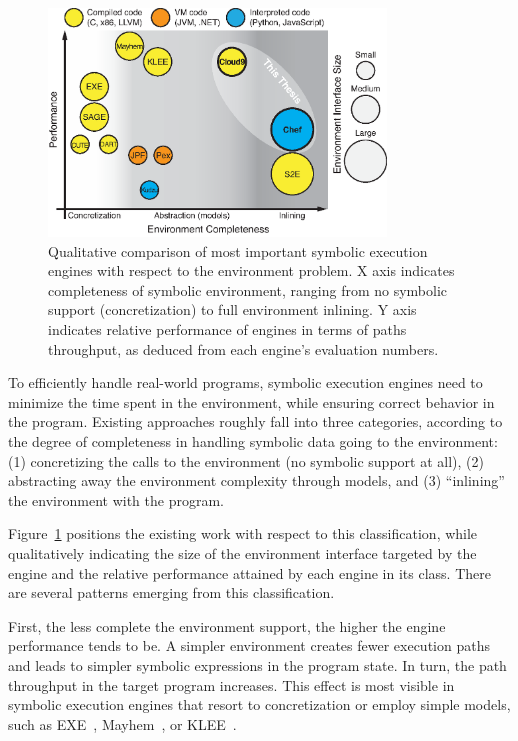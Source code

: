 \begin{figure}
  \centering
  \includegraphics[width=0.8\textwidth]{relatedwork/figures/relwork-positioning}
  \caption{Qualitative comparison of most important symbolic execution engines with respect to the environment problem. X axis indicates completeness of symbolic environment, ranging from no symbolic support (concretization) to full environment inlining.  Y axis indicates relative performance of engines in terms of paths throughput, as deduced from each engine's evaluation numbers.}
  \label{fig:relwork:positioning}
\end{figure}

To efficiently handle real-world programs, symbolic execution engines need to minimize the time spent in the environment, while ensuring correct behavior in the program.
%
Existing approaches roughly fall into three categories, according to the degree of completeness in handling symbolic data going to the environment: (1) concretizing the calls to the environment (no symbolic support at all), (2) abstracting away the environment complexity through models, and (3) ``inlining'' the environment with the program.

Figure~\ref{fig:relwork:positioning} positions the existing work with respect to this classification, while qualitatively indicating the size of the environment interface targeted by the engine and the relative performance attained by each engine in its class.
%
There are several patterns emerging from this classification.

First, the less complete the environment support, the higher the engine performance tends to be.
%
A simpler environment creates fewer execution paths and leads to simpler symbolic expressions in the program state.  In turn, the path throughput in the target program increases.
%
This effect is most visible in symbolic execution engines that resort to concretization or employ simple models, such as EXE~\cite{exe}, Mayhem~\cite{mayhem}, or KLEE~\cite{klee}.

